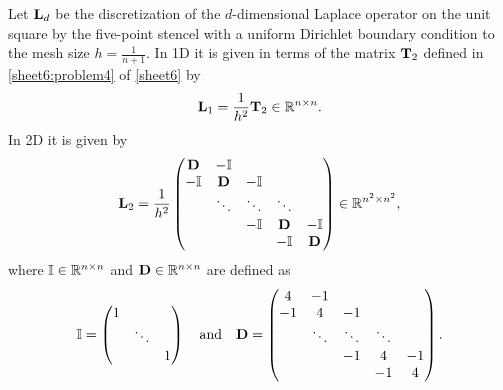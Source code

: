 \begin{Sheet}
  \begin{Problem}[Programming]
    \label{sheet7:problem3}
    Let $\mathbf L_d$ be the discretization of the $d$-dimensional Laplace
    operator on the unit square by the five-point stencel with a
    uniform Dirichlet boundary condition to the mesh size
    $h=\frac1{n+1}$.  In 1D it is given in terms of the matrix
    $\mathbf T_2$ defined in \cref{sheet6:problem4} of \cref{sheet6} by
    \begin{gather*}
    \mathbf L_1 = \frac1{h^2}\mathbf T_2 \in\mathbb R^{n\times n}.
    \end{gather*}
    In 2D it is given by
    \begin{gather*}
    \mathbf L_2 = \frac1{h^2}
    \begin{pmatrix}
    \mathbf D &   -\mathbb I & & & \\
    -\mathbb I &  \mathbf D & -\mathbb I   & & \\
    & \ddots & \ddots & \ddots & \\
    &        &   -\mathbb I &  \mathbf D &   -\mathbb I\\
    &        &        &   -\mathbb I &  \mathbf D
    \end{pmatrix}
    \in\mathbb R^{n^2\times n^2},
    \end{gather*}
    where $\mathbb I\in\mathbb R^{n\times n}$ and $\mathbf D\in\mathbb R^{n\times n}$ are
    defined as
    \begin{gather*}
    \mathbb I =
    \begin{pmatrix}
    1 & & \\
    & \ddots & \\
    &        & 1
    \end{pmatrix}
    \quad\text{and}\quad
    \mathbf D =
    \begin{pmatrix}
    4 & -1 &    && \\
    -1 &  4 & -1 && \\
    & \ddots & \ddots & \ddots & \\
    &    & -1 & 4 & -1 \\
    &    &    & -1 & 4
    \end{pmatrix}.
    \end{gather*}
    

\end{Problem}
\end{Sheet}
